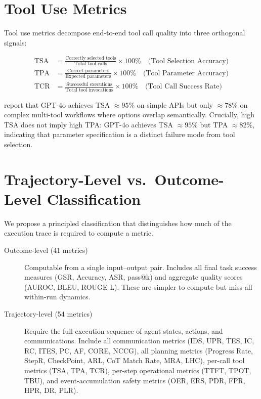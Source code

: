 \documentclass[11pt,a4paper]{article}
\begin{document}
\section{Tool Use Metrics}
\label{sec:tool}

Tool use metrics decompose end-to-end tool call quality into three orthogonal signals:

\begin{align}
  \text{TSA} &= \frac{\text{Correctly selected tools}}{\text{Total tool calls}} \times 100\%
              \quad\text{(Tool Selection Accuracy)} \\[4pt]
  \text{TPA} &= \frac{\text{Correct parameters}}{\text{Expected parameters}} \times 100\%
              \quad\text{(Tool Parameter Accuracy)} \\[4pt]
  \text{TCR} &= \frac{\text{Successful executions}}{\text{Total tool invocations}} \times 100\%
              \quad\text{(Tool Call Success Rate)}
\end{align}

\citet{llm_eval_survey2025} report that GPT-4o achieves TSA $\approx 95\%$ on simple
APIs but only $\approx 78\%$ on complex multi-tool workflows where options overlap
semantically. Crucially, high TSA does not imply high TPA: GPT-4o achieves TSA $\approx
95\%$ but TPA $\approx 82\%$, indicating that parameter specification is a distinct
failure mode from tool selection.

\section{Trajectory-Level vs.\ Outcome-Level Classification}
\label{sec:trajectory}

We propose a principled classification that distinguishes how much of the execution
trace is required to compute a metric.

\begin{description}
  \item[Outcome-level (41 metrics)] Computable from a single input--output pair.
    Includes all final task success measures (GSR, Accuracy, ASR, pass@k) and
    aggregate quality scores (AUROC, BLEU, ROUGE-L). These are simpler to compute
    but miss all within-run dynamics.

  \item[Trajectory-level (54 metrics)] Require the full execution sequence of agent
    states, actions, and communications. Include all communication metrics (IDS, UPR,
    TES, IC, RC, ITES, PC, AF, CORE, NCCG), all planning metrics (Progress Rate,
    StepR, CheckPoint, ARL, CoT Match Rate, MRA, LHC), per-call tool metrics (TSA,
    TPA, TCR), per-step operational metrics (TTFT, TPOT, TBU), and event-accumulation
    safety metrics (OER, ERS, PDR, FPR, HPR, DR, PLR).
\end{description}
\end{document}
